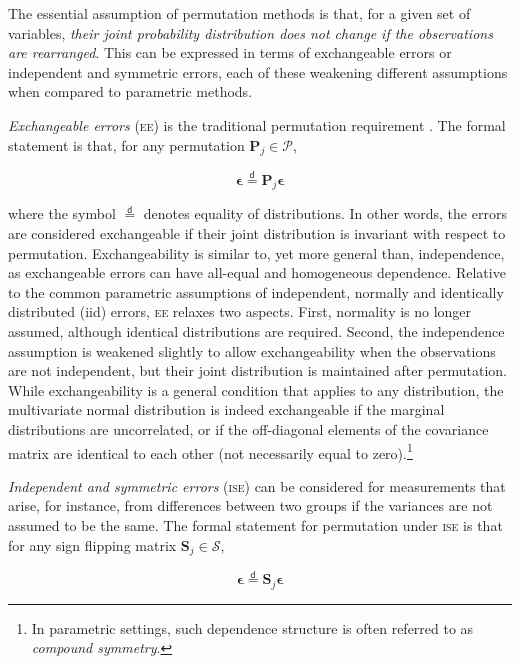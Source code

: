 The essential assumption of permutation methods is that, for a given set of variables, \emph{their joint probability distribution does not change if the observations are rearranged}. This can be expressed in terms of exchangeable errors or independent and symmetric errors, each of these weakening different assumptions when compared to parametric methods.

\emph{Exchangeable errors} (\textsc{ee}) is the traditional permutation requirement \citep{Good2005}. The formal statement is that, for any permutation $\mathbf{P}_{j} \in \mathcal{P}$,

\begin{equation}
\boldsymbol{\epsilon} \stackrel{\mathsf{d}}{=} \mathbf{P}_{j}\boldsymbol{\epsilon}
\end{equation}

\noindent where the symbol $\stackrel{\mathsf{d}}{=}$ denotes equality of distributions. In other words, the errors are considered exchangeable if their joint distribution is invariant with respect to permutation. Exchangeability is similar to, yet more general than, independence, as exchangeable errors can have all-equal and homogeneous dependence. Relative to the common parametric assumptions of independent, normally and identically distributed (iid) errors, \textsc{ee} relaxes two aspects. First, normality is no longer assumed, although identical distributions are required. Second, the independence assumption is weakened slightly to allow exchangeability when the observations are not independent, but their joint distribution is maintained after permutation. While exchangeability is a general condition that applies to any distribution, the multivariate normal distribution is indeed exchangeable if the marginal distributions are uncorrelated, or if the off-diagonal elements of the covariance matrix are identical to each other (not necessarily equal to zero).\footnote{In parametric settings, such dependence structure is often referred to as \emph{compound symmetry}.}

\emph{Independent and symmetric errors} (\textsc{ise}) can be considered for measurements that arise, for instance, from differences between two groups if the variances are not assumed to be the same. The formal statement for permutation under \textsc{ise} is that for any sign flipping matrix $\mathbf{S}_{j} \in \mathcal{S}$,

\begin{equation}
\boldsymbol{\epsilon} \stackrel{\mathsf{d}}{=} \mathbf{S}_{j}\boldsymbol{\epsilon}
\end{equation}

